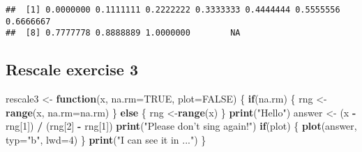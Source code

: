 \documentclass[]{article}
\newenvironment{Shaded}{\begin{snugshade}}{\end{snugshade}}
\newcommand{\ControlFlowTok}[1]{\textcolor[rgb]{0.13,0.29,0.53}{\textbf{#1}}}
\newcommand{\DataTypeTok}[1]{\textcolor[rgb]{0.13,0.29,0.53}{#1}}
\newcommand{\DecValTok}[1]{\textcolor[rgb]{0.00,0.00,0.81}{#1}}
\newcommand{\KeywordTok}[1]{\textcolor[rgb]{0.13,0.29,0.53}{\textbf{#1}}}
\newcommand{\NormalTok}[1]{#1}
\newcommand{\OperatorTok}[1]{\textcolor[rgb]{0.81,0.36,0.00}{\textbf{#1}}}
\newcommand{\OtherTok}[1]{\textcolor[rgb]{0.56,0.35,0.01}{#1}}
\newcommand{\StringTok}[1]{\textcolor[rgb]{0.31,0.60,0.02}{#1}}
\begin{document}
\begin{verbatim}
##  [1] 0.0000000 0.1111111 0.2222222 0.3333333 0.4444444 0.5555556 0.6666667
##  [8] 0.7777778 0.8888889 1.0000000        NA
\end{verbatim}

\hypertarget{rescale-exercise-3}{%
\subsection{Rescale exercise 3}\label{rescale-exercise-3}}

\begin{Shaded}
\begin{Highlighting}[]
\NormalTok{rescale3 <-}\StringTok{ }\ControlFlowTok{function}\NormalTok{(x, }\DataTypeTok{na.rm=}\OtherTok{TRUE}\NormalTok{, }\DataTypeTok{plot=}\OtherTok{FALSE}\NormalTok{) \{}
 \ControlFlowTok{if}\NormalTok{(na.rm) \{}
\NormalTok{ rng <-}\KeywordTok{range}\NormalTok{(x, }\DataTypeTok{na.rm=}\NormalTok{na.rm)}
\NormalTok{ \} }\ControlFlowTok{else}\NormalTok{ \{}
\NormalTok{ rng <-}\KeywordTok{range}\NormalTok{(x)}
\NormalTok{ \}}
 \KeywordTok{print}\NormalTok{(}\StringTok{"Hello"}\NormalTok{)}
\NormalTok{ answer <-}\StringTok{ }\NormalTok{(x }\OperatorTok{-}\StringTok{ }\NormalTok{rng[}\DecValTok{1}\NormalTok{]) }\OperatorTok{/}\StringTok{ }\NormalTok{(rng[}\DecValTok{2}\NormalTok{] }\OperatorTok{-}\StringTok{ }\NormalTok{rng[}\DecValTok{1}\NormalTok{])}
 \KeywordTok{print}\NormalTok{(}\StringTok{"Please don't sing again!"}\NormalTok{)}
 \ControlFlowTok{if}\NormalTok{(plot) \{}
 \KeywordTok{plot}\NormalTok{(answer, }\DataTypeTok{typ=}\StringTok{"b"}\NormalTok{, }\DataTypeTok{lwd=}\DecValTok{4}\NormalTok{)}
\NormalTok{ \}}
 \KeywordTok{print}\NormalTok{(}\StringTok{"I can see it in ..."}\NormalTok{)}
\NormalTok{\}}
\end{Highlighting}
\end{Shaded}
\end{document}
